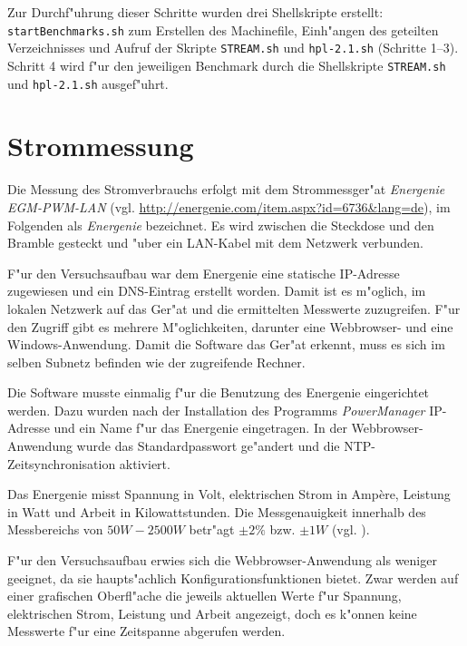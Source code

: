 \noindent
Zur Durchf"uhrung dieser Schritte wurden drei Shellskripte erstellt: \texttt{startBenchmarks.sh} zum Erstellen des Machinefile, Einh"angen des geteilten Verzeichnisses und Aufruf der Skripte \texttt{STREAM.sh} und \texttt{hpl-2.1.\-sh} (Schritte 1--3). Schritt 4 wird f"ur den jeweiligen Benchmark durch die Shellskripte \texttt{STREAM.sh} und \texttt{hpl-2.1.sh} ausgef"uhrt.

\section{Strommessung}
Die Messung des Stromverbrauchs erfolgt mit dem Strommessger"at \textit{Energenie EGM-PWM-LAN} (vgl. \url{http://energenie.com/item.aspx?id=6736&lang=de}), im Folgenden als \textit{Energenie} bezeichnet. Es wird zwischen die Steckdose und den Bramble gesteckt und "uber ein LAN-Kabel mit dem Netzwerk verbunden. 

F"ur den Versuchsaufbau war dem Energenie eine statische IP-Adresse zugewiesen und ein DNS-Eintrag erstellt worden. Damit ist es m"oglich, im lokalen Netzwerk auf das Ger"at und die ermittelten Messwerte zuzugreifen. F"ur den Zugriff gibt es mehrere M"oglichkeiten, darunter eine Webbrowser- und eine Windows-Anwendung. Damit die Software das Ger"at erkennt, muss es sich im selben Subnetz befinden wie der zugreifende Rechner. 

Die Software musste einmalig f"ur die Benutzung des Energenie eingerichtet werden. Dazu wurden nach der Installation des Programms \textit{PowerManager} IP-Adresse und ein Name f"ur das Energenie eingetragen. In der Webbrowser-Anwendung wurde das Standardpasswort ge"andert und die NTP-Zeitsynchronisation aktiviert. 

Das Energenie misst Spannung in Volt, elektrischen Strom in Amp\`{e}re, Leistung in Watt und Arbeit in Kilowattstunden. Die Messgenauigkeit innerhalb des Messbereichs von $50 W - 2500 W$ betr"agt $\pm 2\%$ bzw. $\pm 1 W$ (vgl. \cite{scrguide03}). %

F"ur den Versuchsaufbau erwies sich die Webbrowser-Anwendung als weniger geeignet, da sie haupts"achlich Konfigurationsfunktionen bietet. Zwar werden auf einer grafischen Oberfl"ache die jeweils aktuellen Werte f"ur Spannung, elektrischen Strom, Leistung und Arbeit angezeigt, doch es k"onnen keine Messwerte f"ur eine Zeitspanne abgerufen werden. 

